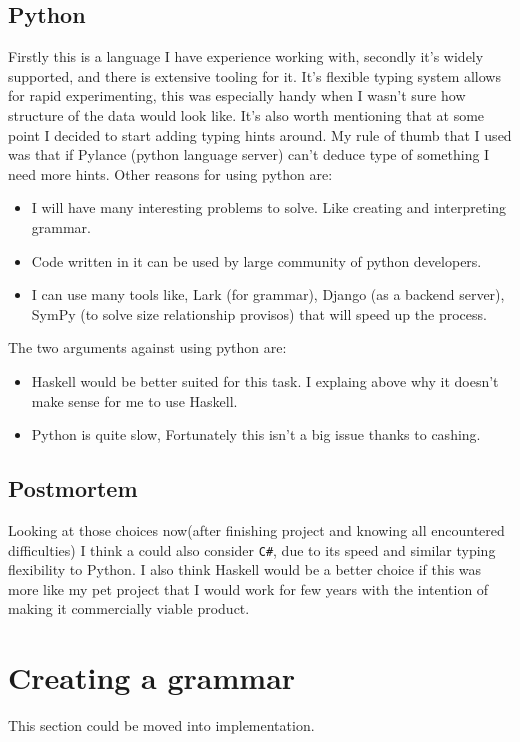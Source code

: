 \documentclass[14pt]{report}
\begin{document}
\subsection{Python}
Firstly this is a language I have experience working with, secondly it's widely supported, and there is extensive tooling for it. It's flexible typing system allows for rapid experimenting, this was especially handy when I wasn't sure how structure of the data would look like. It's also worth mentioning that at some point I decided to start adding typing hints around. My rule of thumb that I used was that if Pylance (python language server) can't deduce type of something I need more hints.
Other reasons for using python are:
\begin{itemize}
    \item I will have many interesting problems to solve. Like creating and interpreting grammar.
    \item Code written in it can be used by large community of python developers.
    \item I can use many tools like, Lark (for grammar), Django (as a backend server), SymPy (to solve size relationship provisos) that will speed up the process.
\end{itemize}
The two arguments against using python are:
\begin{itemize}
    \item Haskell would be better suited for this task. I explaing above why it doesn't make sense for me to use Haskell. 
    \item Python is quite slow, Fortunately this isn't a big issue thanks to cashing.
\end{itemize}
\subsection{Postmortem}
Looking at those choices now(after finishing project and knowing all encountered difficulties) I think a could also consider \verb!C#!, due to its speed and similar typing flexibility to Python. I also think Haskell would be a better choice if this was more like my pet project that I would work for few years with the intention of making it commercially viable product.

\section{Creating a grammar}
This section could be moved into implementation.
\end{document}
